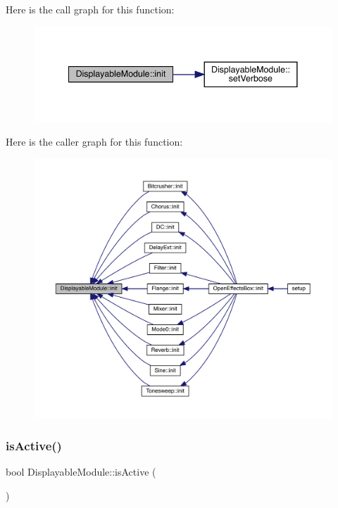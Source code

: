 Here is the call graph for this function\+:\nopagebreak
\begin{figure}[H]
\begin{center}
\leavevmode
\includegraphics[width=341pt]{class_displayable_module_a12010231a6a049a1110b642cc1c83efd_cgraph}
\end{center}
\end{figure}
Here is the caller graph for this function\+:\nopagebreak
\begin{figure}[H]
\begin{center}
\leavevmode
\includegraphics[width=350pt]{class_displayable_module_a12010231a6a049a1110b642cc1c83efd_icgraph}
\end{center}
\end{figure}
\mbox{\label{class_displayable_module_ac681bcbdec3aa9daeb1d9ade59f0313c}} 
\subsubsection{\texorpdfstring{is\+Active()}{isActive()}}
{\footnotesize\ttfamily bool Displayable\+Module\+::is\+Active (\begin{DoxyParamCaption}{ }\end{DoxyParamCaption})}

